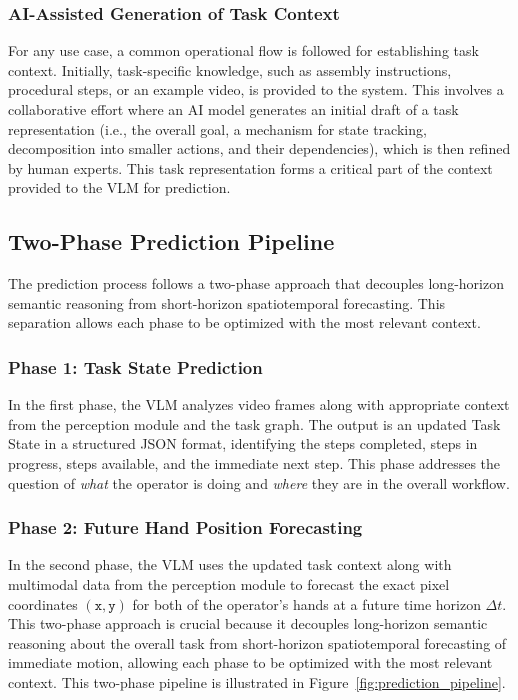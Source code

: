 \subsubsection{AI-Assisted Generation of Task Context}

For any use case, a common operational flow is followed for establishing task context. Initially, task-specific knowledge, such as assembly instructions, procedural steps, or an example video, is provided to the system. This involves a collaborative effort where an AI model generates an initial draft of a task representation (i.e., the overall goal, a mechanism for state tracking, decomposition into smaller actions, and their dependencies), which is then refined by human experts. This task representation forms a critical part of the context provided to the VLM for prediction.

\subsection{Two-Phase Prediction Pipeline}

The prediction process follows a two-phase approach that decouples long-horizon semantic reasoning from short-horizon spatiotemporal forecasting. This separation allows each phase to be optimized with the most relevant context.

\subsubsection{Phase 1: Task State Prediction}

In the first phase, the VLM analyzes video frames along with appropriate context from the perception module and the task graph. The output is an updated Task State in a structured JSON format, identifying the steps completed, steps in progress, steps available, and the immediate next step. This phase addresses the question of \emph{what} the operator is doing and \emph{where} they are in the overall workflow.

\subsubsection{Phase 2: Future Hand Position Forecasting}

In the second phase, the VLM uses the updated task context along with multimodal data from the perception module to forecast the exact pixel coordinates $(\texttt{x}, \texttt{y})$ for both of the operator's hands at a future time horizon $\Delta t$. This two-phase approach is crucial because it decouples long-horizon semantic reasoning about the overall task from short-horizon spatiotemporal forecasting of immediate motion, allowing each phase to be optimized with the most relevant context. This two-phase pipeline is illustrated in Figure~\ref{fig:prediction_pipeline}.

